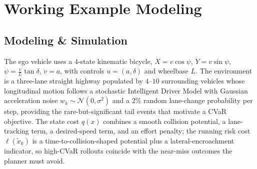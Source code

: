 \documentclass[letterpaper, 10 pt, conference]{ieeeconf}  %
\begin{document}
\section{Working Example Modeling}
\subsection{Modeling \& Simulation}
The ego vehicle uses a 4-state kinematic bicycle, $\dot{X}\!=\!v\cos\psi$, $\dot{Y}\!=\!v\sin\psi$, $\dot\psi\!=\!\tfrac{v}{L}\tan\delta$, $\dot v\!=\!a$, with controls $u\!=\!(a,\delta)$ and wheelbase $L$. The environment is a three-lane straight highway populated by $4$--$10$ surrounding vehicles whose longitudinal motion follows a stochastic Intelligent Driver Model with Gaussian acceleration noise $w_k\!\sim\!\mathcal{N}(0,\sigma^{2})$ and a $2\%$ random lane-change probability per step, providing the rare-but-significant tail events that motivate a CVaR objective. The state cost $q(x)$ combines a smooth collision potential, a lane-tracking term, a desired-speed term, and an effort penalty; the running risk cost $\ell(\tilde{x}_k)$ is a time-to-collision-shaped potential plus a lateral-encroachment indicator, so high-CVaR rollouts coincide with the near-miss outcomes the planner must avoid.
\end{document}
